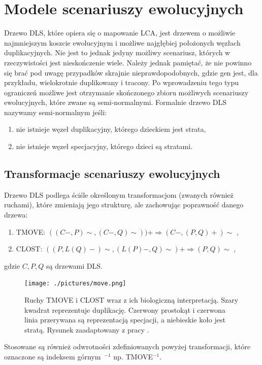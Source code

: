 \documentclass[licencjacka]{pracamgr}
\begin{document}
\section{Modele scenariuszy ewolucyjnych}

Drzewo DLS, które opiera się o mapowanie LCA, jest drzewem o możliwie najmniejszym koszcie ewolucyjnym i możliwe najgłębiej położonych węzłach duplikacyjnych. Nie jest to jednak jedyny możliwy scenariusz, których w rzeczywistości jest nieskończenie wiele. Należy jednak pamiętać, że nie powinno się brać pod uwagę przypadków skrajnie nieprawdopodobnych, gdzie gen jest, dla przykładu, wielokrotnie duplikowany i tracony. Po wprowadzeniu tego typu ograniczeń możliwe jest otrzymanie skończonego zbioru możliwych scenariuszy ewolucyjnych, które zwane są semi-normalnymi. Formalnie drzewo DLS nazywamy semi-normalnym jeśli:
\begin{enumerate}
\item nie istnieje węzeł duplikacyjny, którego dzieckiem jest strata,
\item nie istnieje węzeł specjacyjny, którego dzieci są stratami.
\end{enumerate}


\subsection{Transformacje scenariuszy ewolucyjnych}

Drzewo DLS podlega ściśle określonym transformacjom (zwanych również ruchami), które zmieniają jego strukturę, ale zachowując poprawność danego drzewa: 
\begin{enumerate}
\item TMOVE: $((C-,P)\sim,(C-,Q)\sim))+   \Longrightarrow    (C-,(P,Q)+)\sim $ ,
\item CLOST: $((P,L(Q)-)\sim,(L(P)-,Q)\sim)+   \Longrightarrow   (P,Q)\sim $ ,
\end{enumerate}
gdzie $C,P,Q$ są drzewami DLS.

\begin{figure}[H]
  \centering
  \texttt{[image: ./pictures/move.png]}
  \caption{Ruchy TMOVE i CLOST wraz z ich biologiczną interpretacją. Szary  kwadrat reprezentuje duplikację. Czerwony prostokąt i czerwona linia przerywana są reprezentacją specjacji, a niebieskie koło jest stratą. Rysunek zaadaptowany z pracy \cite{dls}.}
\end{figure}



Stosowane są również odwrotności zdefiniowanych powyżej transformacji, które oznaczone są indeksem górnym~$^{-1}$ np. TMOVE$^{-1}$.
\end{document}
